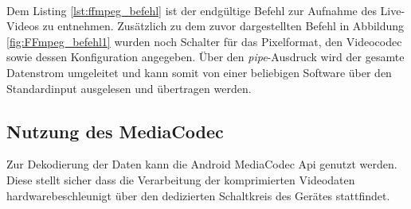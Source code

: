 ~\\
Dem Listing \ref{lst:ffmpeg_befehl} ist der endgültige Befehl zur Aufnahme des Live-Videos zu entnehmen. Zusätzlich zu dem zuvor dargestellten Befehl in Abbildung \ref{fig:FFmpeg_befehl1} wurden noch Schalter für das Pixelformat, den Videocodec sowie dessen Konfiguration angegeben. Über den \textit{pipe}-Ausdruck wird der gesamte Datenstrom umgeleitet und kann somit von einer beliebigen Software über den Standardinput ausgelesen und übertragen werden.

\subsection{Nutzung des MediaCodec}
Zur Dekodierung der Daten kann die Android MediaCodec Api genutzt werden. Diese stellt sicher dass die Verarbeitung der komprimierten Videodaten hardwarebeschleunigt über den dedizierten Schaltkreis des Gerätes stattfindet. \\

